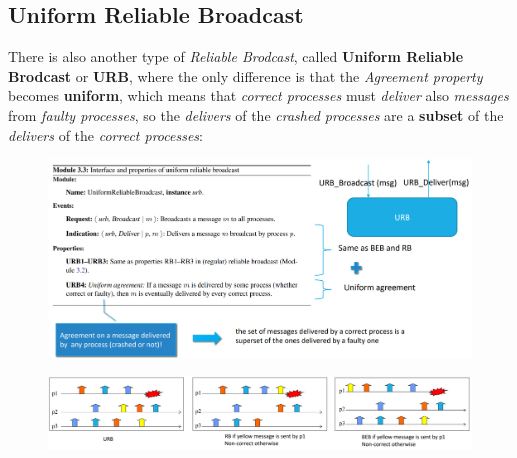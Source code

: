 \documentclass{article}
\begin{document}
\subsection{Uniform Reliable Broadcast}
There is also another type of \emph{Reliable Brodcast}, called \textbf{Uniform Reliable Brodcast} or \textbf{URB}, where the only difference is that the \emph{Agreement property} becomes \textbf{uniform}, which means that \emph{correct processes} must \emph{deliver} also \emph{messages} from \emph{faulty processes}, so the \emph{delivers} of the \emph{crashed processes} are a \textbf{subset} of the \emph{delivers} of the \emph{correct processes}:
\begin{figure}[H]
  \centering
  \includegraphics[scale=0.6,left]{cattura36.png}
\end{figure}
\begin{figure}[H]
  \centering
  \includegraphics[scale=0.5,left]{cattura37.png}
\end{figure}
\end{document}

